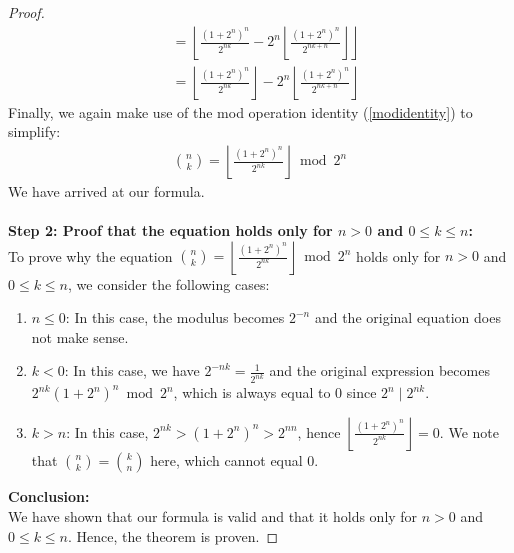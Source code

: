 \documentclass{article}
\theoremstyle{plain}
\theoremstyle{definition}
\begin{document}
\begin{proof}
\begin{align}
&= \left\lfloor\frac{(1 + 2^{n})^{n}}{2^{n k}} - 2^{n} \left\lfloor \frac{(1 + 2^{n})^{n}}{2^{n k + n}} \right\rfloor\right\rfloor \\
&= \left\lfloor\frac{(1 + 2^{n})^{n}}{2^{n k}}\right\rfloor - 2^{n} \left\lfloor \frac{(1 + 2^{n})^{n}}{2^{n k + n}} \right\rfloor
\end{align}
Finally, we again make use of the mod operation identity (\ref{modidentity}) to simplify:
\begin{align}
\binom{n}{k} = \left\lfloor\frac{(1 + 2^{n})^{n}}{2^{n k}}\right\rfloor \bmod{2^{n}}
\end{align}
We have arrived at our formula.
\\
\\
\textbf{Step 2: Proof that the equation holds only for $n > 0$ and $0 \leq k \leq n$:}
\\
To prove why the equation $\binom{n}{k} = \left\lfloor\frac{(1 + 2^n)^n}{2^{nk}}\right\rfloor \bmod{2^n}$ holds only for $n > 0$ and $0 \leq k \leq n$, we consider the following cases:

\begin{enumerate}
\item $n \leq 0$: In this case, the modulus becomes $2^{-n}$ and the original equation does not make sense.

\item $k < 0$: In this case, we have $2^{-nk} = \frac{1}{2^{nk}}$ and the original expression becomes $2^{nk} (1 + 2^n)^n \bmod{2^n}$, which is always equal to $0$ since $2^{n} \mid 2^{nk}$.

\item $k > n$: In this case, $2^{nk} > (1 + 2^n)^n > 2^{nn}$, hence $\left\lfloor\frac{(1 + 2^n)^n}{2^{nk}}\right\rfloor = 0$. We note that $\binom{n}{k} = \binom{k}{n}$ here, which cannot equal $0$.
\end{enumerate}
\noindent
\textbf{Conclusion:}
\\
We have shown that our formula is valid and that it holds only for $n > 0$ and $0 \leq k \leq n$. Hence, the theorem is proven.
\end{proof}
\end{document}
